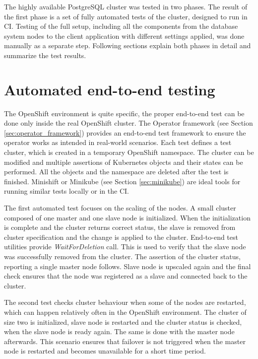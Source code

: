 \documentclass[
  digital, %
  twoside, %
  table,   %
  nolof,   %
  nolot,   %
]{fithesis3}
\begin{document}
The highly available PostgreSQL cluster was tested in two phases. The result of the first phase is a set of fully automated tests of the cluster, designed to run in CI. Testing of the full setup, including all the components from the database system nodes to the client application with different settings applied,  was done manually as a separate step. Following sections explain both phases in detail and summarize the test results.

\section{Automated end-to-end testing}
The OpenShift environment is quite specific, the proper end-to-end test can be done only inside the real OpenShift cluster. The Operator framework (see Section \ref{sec:operator_framework}) provides an end-to-end test framework to ensure the operator works as intended in real-world scenarios. Each test defines a test cluster, which is created in a temporary OpenShift namespace. The cluster can be modified and multiple assertions of Kubernetes objects and their states can be performed. All the objects and the namespace are deleted after the test is finished. Minishift or Minikube (see Section \ref{sec:minikube}) are ideal tools for running similar tests locally or in the CI.

The first automated test focuses on the scaling of the nodes. A small cluster composed of one master and one slave node is initialized. When the initialization is complete and the cluster returns correct status, the slave is removed from cluster specification and the change is applied to the cluster. End-to-end test utilities provide \textit{WaitForDeletion} call. This is used to verify that the slave node was successfully removed from the cluster. The assertion of the cluster status, reporting a single master node follows.  Slave node is upscaled again and the final check ensures that the node was registered as a slave and connected back to the cluster.

The second test checks cluster behaviour when some of the nodes are restarted, which can happen relatively often in the OpenShift environment. The cluster of size two is initialized, slave node is restarted and the cluster status is checked, when the slave node is ready again. The same is done with the master node afterwards. This scenario ensures that failover is not triggered when the master node is restarted and becomes unavailable for a short time period.
\end{document}
